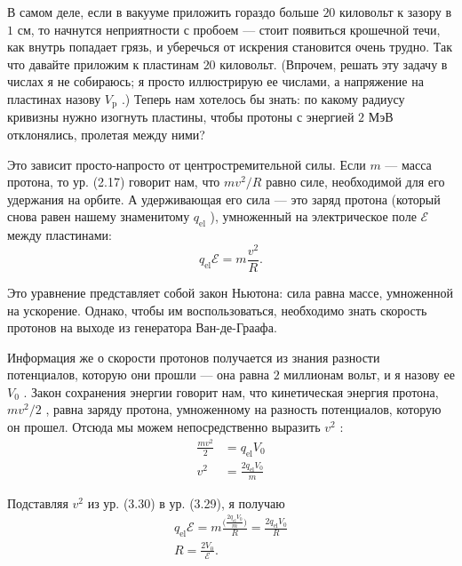 \documentclass[11pt,oneside]{article}
\providecommand{\emf}{\mathcal{E}}
\begin{document}
В самом деле, если в вакууме приложить гораздо больше \(20\) киловольт к зазору в \(1\) см, то начнутся неприятности с пробоем --- стоит появиться крошечной течи, как внутрь попадает грязь, и уберечься от искрения становится очень трудно. Так что давайте приложим к пластинам \(20\) киловольт. (Впрочем, решать эту задачу в числах я не собираюсь; я просто иллюстрирую ее числами, а напряжение на пластинах назову \(V_\text{p}\) .) Теперь нам хотелось бы знать: по какому радиусу кривизны нужно изогнуть пластины, чтобы протоны с энергией \(2\) МэВ отклонялись, пролетая между ними?\par

Это зависит просто-напросто от центростремительной силы. Если \(m\) --- масса протона, то ур. (2.17) говорит нам, что \(mv^2/R\) равно силе, необходимой для его удержания на орбите. А удерживающая его сила --- это заряд протона (который снова равен нашему знаменитому \(q_\text{el}\) ), умноженный на электрическое поле \(\emf\) между пластинами: 
\begin{equation*} \tag{3.29}
\label{Eq:TIPS:3:29} q_\text{el}\emf = m\frac{v^2}{R}. \end{equation*}
\par

Это уравнение представляет собой закон Ньютона: сила равна массе, умноженной на ускорение. Однако, чтобы им воспользоваться, необходимо знать скорость протонов на выходе из генератора Ван-де-Граафа.\par

Информация же о скорости протонов получается из знания разности потенциалов, которую они прошли --- она равна \(2\) миллионам вольт, и я назову ее \(V_0\) . Закон сохранения энергии говорит нам, что кинетическая энергия протона, \(mv^2/2\) , равна заряду протона, умноженному на разность потенциалов, которую он прошел. Отсюда мы можем непосредственно выразить \(v^2\) : 
\begin{equation*} \begin{aligned} \frac{mv^2}{2} &= q_\text{el}V_0\\[1ex] v^2 &= \frac{2q_\text{el}V_0}{m} \end{aligned} \tag{3.30}
\label{Eq:TIPS:3:30} \end{equation*}
\par

Подставляя \(v^2\) из ур. (3.30) в ур. (3.29), я получаю 
\begin{equation*} \begin{gathered} q_\text{el}\emf = m\frac{\displaystyle \bigg(\frac{2q_\text{el}V_0}{m}\bigg)}{R} = \frac{2q_\text{el}V_0}{R}\\[1em] R = \frac{2V_0}{\emf}. \end{gathered} \tag{3.31}
\label{Eq:TIPS:3:31} \end{equation*}
\par
\end{document}
